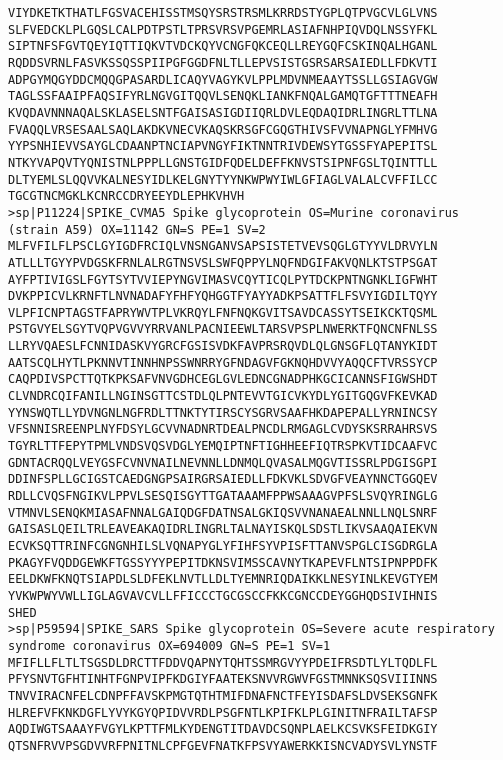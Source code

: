 \documentclass[en,black,12pt,normal]{elegantnote}
\begin{document}
\begin{lstlisting}
VIYDKETKTHATLFGSVACEHISSTMSQYSRSTRSMLKRRDSTYGPLQTPVGCVLGLVNS
SLFVEDCKLPLGQSLCALPDTPSTLTPRSVRSVPGEMRLASIAFNHPIQVDQLNSSYFKL
SIPTNFSFGVTQEYIQTTIQKVTVDCKQYVCNGFQKCEQLLREYGQFCSKINQALHGANL
RQDDSVRNLFASVKSSQSSPIIPGFGGDFNLTLLEPVSISTGSRSARSAIEDLLFDKVTI
ADPGYMQGYDDCMQQGPASARDLICAQYVAGYKVLPPLMDVNMEAAYTSSLLGSIAGVGW
TAGLSSFAAIPFAQSIFYRLNGVGITQQVLSENQKLIANKFNQALGAMQTGFTTTNEAFH
KVQDAVNNNAQALSKLASELSNTFGAISASIGDIIQRLDVLEQDAQIDRLINGRLTTLNA
FVAQQLVRSESAALSAQLAKDKVNECVKAQSKRSGFCGQGTHIVSFVVNAPNGLYFMHVG
YYPSNHIEVVSAYGLCDAANPTNCIAPVNGYFIKTNNTRIVDEWSYTGSSFYAPEPITSL
NTKYVAPQVTYQNISTNLPPPLLGNSTGIDFQDELDEFFKNVSTSIPNFGSLTQINTTLL
DLTYEMLSLQQVVKALNESYIDLKELGNYTYYNKWPWYIWLGFIAGLVALALCVFFILCC
TGCGTNCMGKLKCNRCCDRYEEYDLEPHKVHVH
>sp|P11224|SPIKE_CVMA5 Spike glycoprotein OS=Murine coronavirus (strain A59) OX=11142 GN=S PE=1 SV=2
MLFVFILFLPSCLGYIGDFRCIQLVNSNGANVSAPSISTETVEVSQGLGTYYVLDRVYLN
ATLLLTGYYPVDGSKFRNLALRGTNSVSLSWFQPPYLNQFNDGIFAKVQNLKTSTPSGAT
AYFPTIVIGSLFGYTSYTVVIEPYNGVIMASVCQYTICQLPYTDCKPNTNGNKLIGFWHT
DVKPPICVLKRNFTLNVNADAFYFHFYQHGGTFYAYYADKPSATTFLFSVYIGDILTQYY
VLPFICNPTAGSTFAPRYWVTPLVKRQYLFNFNQKGVITSAVDCASSYTSEIKCKTQSML
PSTGVYELSGYTVQPVGVVYRRVANLPACNIEEWLTARSVPSPLNWERKTFQNCNFNLSS
LLRYVQAESLFCNNIDASKVYGRCFGSISVDKFAVPRSRQVDLQLGNSGFLQTANYKIDT
AATSCQLHYTLPKNNVTINNHNPSSWNRRYGFNDAGVFGKNQHDVVYAQQCFTVRSSYCP
CAQPDIVSPCTTQTKPKSAFVNVGDHCEGLGVLEDNCGNADPHKGCICANNSFIGWSHDT
CLVNDRCQIFANILLNGINSGTTCSTDLQLPNTEVVTGICVKYDLYGITGQGVFKEVKAD
YYNSWQTLLYDVNGNLNGFRDLTTNKTYTIRSCYSGRVSAAFHKDAPEPALLYRNINCSY
VFSNNISREENPLNYFDSYLGCVVNADNRTDEALPNCDLRMGAGLCVDYSKSRRAHRSVS
TGYRLTTFEPYTPMLVNDSVQSVDGLYEMQIPTNFTIGHHEEFIQTRSPKVTIDCAAFVC
GDNTACRQQLVEYGSFCVNVNAILNEVNNLLDNMQLQVASALMQGVTISSRLPDGISGPI
DDINFSPLLGCIGSTCAEDGNGPSAIRGRSAIEDLLFDKVKLSDVGFVEAYNNCTGGQEV
RDLLCVQSFNGIKVLPPVLSESQISGYTTGATAAAMFPPWSAAAGVPFSLSVQYRINGLG
VTMNVLSENQKMIASAFNNALGAIQDGFDATNSALGKIQSVVNANAEALNNLLNQLSNRF
GAISASLQEILTRLEAVEAKAQIDRLINGRLTALNAYISKQLSDSTLIKVSAAQAIEKVN
ECVKSQTTRINFCGNGNHILSLVQNAPYGLYFIHFSYVPISFTTANVSPGLCISGDRGLA
PKAGYFVQDDGEWKFTGSSYYYPEPITDKNSVIMSSCAVNYTKAPEVFLNTSIPNPPDFK
EELDKWFKNQTSIAPDLSLDFEKLNVTLLDLTYEMNRIQDAIKKLNESYINLKEVGTYEM
YVKWPWYVWLLIGLAGVAVCVLLFFICCCTGCGSCCFKKCGNCCDEYGGHQDSIVIHNIS
SHED
>sp|P59594|SPIKE_SARS Spike glycoprotein OS=Severe acute respiratory syndrome coronavirus OX=694009 GN=S PE=1 SV=1
MFIFLLFLTLTSGSDLDRCTTFDDVQAPNYTQHTSSMRGVYYPDEIFRSDTLYLTQDLFL
PFYSNVTGFHTINHTFGNPVIPFKDGIYFAATEKSNVVRGWVFGSTMNNKSQSVIIINNS
TNVVIRACNFELCDNPFFAVSKPMGTQTHTMIFDNAFNCTFEYISDAFSLDVSEKSGNFK
HLREFVFKNKDGFLYVYKGYQPIDVVRDLPSGFNTLKPIFKLPLGINITNFRAILTAFSP
AQDIWGTSAAAYFVGYLKPTTFMLKYDENGTITDAVDCSQNPLAELKCSVKSFEIDKGIY
QTSNFRVVPSGDVVRFPNITNLCPFGEVFNATKFPSVYAWERKKISNCVADYSVLYNSTF

\end{lstlisting}
\end{document}

